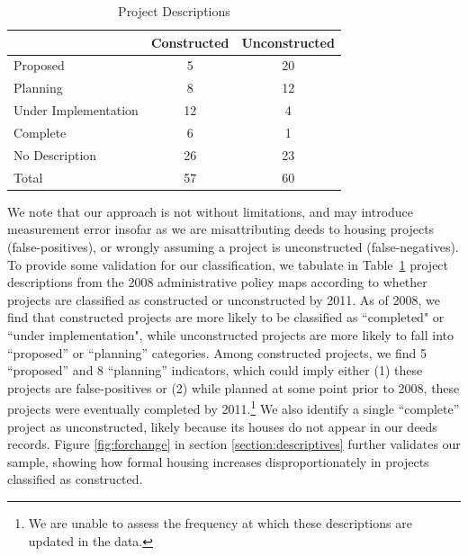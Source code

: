 \documentclass[12pt]{article}
\begin{document}
\begin{table}[h!]
\centering
\caption{Project Descriptions}\label{table:projectdescriptions}
\vspace{-2mm}
\begin{tabular}{l*{1}{cc}}
\toprule
 &Constructed &Unconstructed  \\
\midrule
Proposed   &          5  &    20  \\
Planning   &          8  &    12  \\
Under Implementation& 12 &     4  \\
Complete   &          6  &     1  \\
No Description &     26  &    23  \\ 
Total             &  57  &    60  \\
\bottomrule
\end{tabular}
\end{table}

We note that our approach is not without limitations, and may introduce measurement error insofar as we are misattributing deeds to housing projects (false-positives), or wrongly assuming a project is unconstructed (false-negatives). To provide some validation for our classification, we tabulate in Table~\ref{table:projectdescriptions} project descriptions from the 2008 administrative policy maps according to whether projects are classified as constructed or unconstructed by 2011.  As of 2008, we find that constructed projects are more likely to be classified as ``completed" or ``under implementation", while unconstructed projects are more likely to fall into ``proposed'' or ``planning'' categories.  Among constructed projects, we find 5 ``proposed'' and 8 ``planning'' indicators, which could imply either (1) these projects are false-positives or (2) while planned at some point prior to 2008, these projects were eventually completed by 2011.\footnote{We are unable to assess the frequency at which these descriptions are updated in the data.}  We also identify a single ``complete'' project as unconstructed, likely because its houses do not appear in our deeds records.  Figure \ref{fig:forchange} in section \ref{section:descriptives} further validates our sample, showing how formal housing increases disproportionately in projects classified as constructed. 


\end{document}
